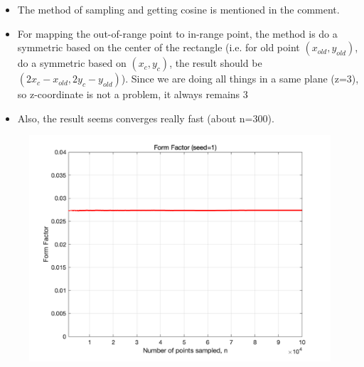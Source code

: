 \documentclass{article}
\begin{document}
\begin{itemize}
    \item The method of sampling and getting cosine is mentioned in the comment.
    \item For mapping the out-of-range point to in-range point, the method is do a symmetric
        based on the center of the rectangle (i.e. for old point $(x_{old},y_{old})$, do a symmetric
        based on $(x_c,y_c)$, the result should be $(2x_c-x_{old},2y_c-y_{old})$). Since we are doing
        all things in a same plane (z=3), so z-coordinate is not a problem, it always remains 3 
    \item Also, the result seems converges really fast (about n=300).
\end{itemize}
\begin{figure}
    \includegraphics[width=\linewidth]{img/q2.png}
\end{figure}

\newpage
\end{document}
